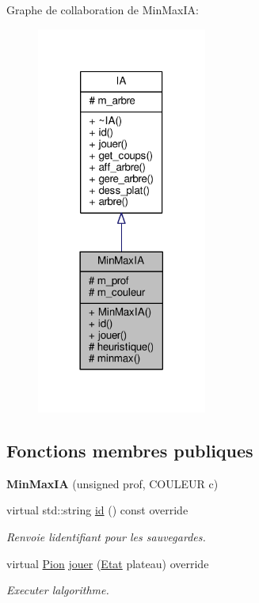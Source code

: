 Graphe de collaboration de Min\+Max\+IA\+:\nopagebreak
\begin{figure}[H]
\begin{center}
\leavevmode
\includegraphics[width=158pt]{classMinMaxIA__coll__graph}
\end{center}
\end{figure}
\subsection*{Fonctions membres publiques}
\begin{DoxyCompactItemize}
\item 
{\bfseries Min\+Max\+IA} (unsigned prof, C\+O\+U\+L\+E\+UR c)\hypertarget{classMinMaxIA_ab186638b8bf69698b86415555734a926}{}\label{classMinMaxIA_ab186638b8bf69698b86415555734a926}

\item 
virtual std\+::string \hyperlink{classMinMaxIA_ace6db5b6ab7a0aaba72d2bf16a44f6f3}{id} () const override\hypertarget{classMinMaxIA_ace6db5b6ab7a0aaba72d2bf16a44f6f3}{}\label{classMinMaxIA_ace6db5b6ab7a0aaba72d2bf16a44f6f3}

\begin{DoxyCompactList}\small\item\em Renvoie l\textquotesingle{}identifiant pour les sauvegardes. \end{DoxyCompactList}\item 
virtual \hyperlink{structPion}{Pion} \hyperlink{classMinMaxIA_a829500a59568c81e902862933e4f9931}{jouer} (\hyperlink{structEtat}{Etat} plateau) override\hypertarget{classMinMaxIA_a829500a59568c81e902862933e4f9931}{}\label{classMinMaxIA_a829500a59568c81e902862933e4f9931}

\begin{DoxyCompactList}\small\item\em Executer l\textquotesingle{}algorithme. \end{DoxyCompactList}\end{DoxyCompactItemize}
